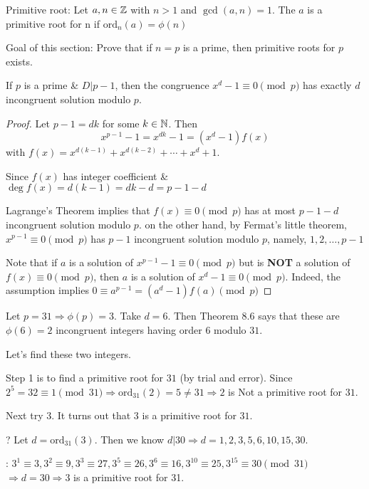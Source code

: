 Primitive root:
Let $a, n \in \mathbb{Z}$ with $n > 1$ and $\gcd(a, n) = 1$. The 
$a$ is a primitive root for n if $\text{ord}_n(a) = \phi(n)$

Goal of this section: 
Prove that if $n = p$ is a prime, then primitive roots for $p$ exists.

\begin{corollary}
    If $p$ is a prime \& $D|p-1$, then the congruence $x^d - 1 \equiv 0 \pmod p$ has exactly $d$
    incongruent solution modulo $p$.
\end{corollary}
\begin{proof}
    Let $p - 1 = dk$ for some $k \in \mathbb{N}$.
    Then
    \[
        x^{p-1}-1 = x^{dk}-1 = (x^d - 1)f(x)
    \]
    with $f(x) = x^{d(k-1)} + x^{d(k-2)} + \cdots + x^d + 1$.

    Since $f(x)$ has integer coefficient \& $\deg f(x) = d(k-1) = dk-d = p-1-d$

    Lagrange's Theorem implies that $f(x) \equiv 0 \pmod p$ has at most $p-1-d$ incongruent solution modulo $p$.
    on the other hand, by Fermat's little theorem, $x^{p-1} \equiv 0 \pmod p$ has $p-1$ incongruent solution modulo $p$, namely, $1, 2, \dots, p-1$

    Note that if $a$ is a solution of $x^{p-1}-1 \equiv 0 \pmod p$ but is \textbf{NOT} a solution of $f(x) \equiv 0 \pmod p$,
    then $a$ is a solution of $x^d-1 \equiv 0 \pmod p$. 
    Indeed, the assumption implies $0 \equiv a^{p-1} = (a^d - 1)f(a) \pmod p$

    
\end{proof}


\begin{eg}
    Let $p = 31 \Rightarrow \phi(p) = 3$.
    Take $d = 6$. Then Theorem 8.6 says that these are $\phi(6) = 2$ 
    incongruent integers having order $6$ modulo $31$.

    Let's find these two integers.

    Step 1 is to find a primitive root for $31$ (by trial and error).
    Since $2^5 = 32 \equiv 1 \pmod {31} \Rightarrow \text{ord}_{31}(2) = 5 \neq 31 \Rightarrow 2$ is Not a primitive root 
    for $31$.

    Next try $3$. It turns out that $3$ is a primitive root for $31$.

    ? Let $d = \text{ord}_{31}(3)$. Then we know $d | 30 \Rightarrow d = 1, 2, 3, 5, 6, 10, 15, 30$.

    : $3^1 \equiv 3, 3^2 \equiv 9, 3^3 \equiv 27, 3^5 \equiv 26, 3^6 \equiv 16, 3^{10} \equiv 25, 3^{15} \equiv 30 \pmod {31}$
    $\Rightarrow d = 30 \Rightarrow 3$ is a primitive root for 31.
\end{eg}


